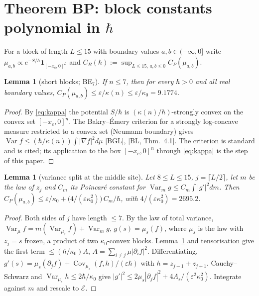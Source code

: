 \documentclass[11pt,a4paper]{article}
\newtheorem{lemma}[theorem]{Lemma}
\theoremstyle{definition}
\theoremstyle{remark}
\newcommand{\Var}{\operatorname{Var}}
\newcommand{\Cov}{\operatorname{Cov}}
\newcommand{\cE}{\mathcal{E}}
\newcommand{\xc}{x_c}
\begin{document}
\section{Theorem BP: block constants polynomial in \texorpdfstring{$\hbar$}{hbar}}\label{sec:BP}

For a block of length $L\le15$ with boundary values $a,b\in(-\infty,0]$ write $\mu_{a,b}\propto e^{-S/\hbar}\mathbf 1_{[-\xc,0]^L}$ and $C_B(\hbar):=\sup_{L\le15,\,a,b\le0}C_P(\mu_{a,b})$.

\begin{lemma}[short blocks; BE$_7$]\label{lem:BE7}
If $n\le7$, then for every $\hbar>0$ and all real boundary values, $C_P(\mu_{a,b})\le\varepsilon/\kappa(n)\le\varepsilon/\kappa_0=9.1774$.
\end{lemma}
\begin{proof}
By \eqref{eq:kappa} the potential $S/\hbar$ is $(\kappa(n)/\hbar)$-strongly convex on the convex set $[-\xc,0]^n$. The Bakry--\'Emery criterion for a strongly log-concave measure restricted to a convex set (Neumann boundary) gives $\Var f\le(\hbar/\kappa(n))\int|\nabla f|^2d\mu$ [BGL], [BL, Thm.~4.1]. The criterion is standard and is cited; its application to the box $[-\xc,0]^n$ through \eqref{eq:kappa} is the step of this paper.
\end{proof}

\begin{lemma}[variance split at the middle site]\label{lem:split}
Let $8\le L\le15$, $j=\lceil L/2\rceil$, let $m$ be the law of $z_j$ and $C_m$ its Poincar\'e constant for $\Var_mg\le C_m\int|g'|^2dm$. Then $C_P(\mu_{a,b})\le\varepsilon/\kappa_0+\big(4/(\varepsilon\kappa_0^2)\big)\,C_m/\hbar$, with $4/(\varepsilon\kappa_0^2)=2695.2$.
\end{lemma}
\begin{proof}
Both sides of $j$ have length $\le7$. By the law of total variance, $\Var_\mu f=m(\Var_{\mu_s}f)+\Var_m g$, $g(s)=\mu_s(f)$, where $\mu_s$ is the law with $z_j=s$ frozen, a product of two $\kappa_0$-convex blocks. Lemma~\ref{lem:BE7} and tensorisation give the first term $\le(\hbar/\kappa_0)A$, $A=\sum_{i\ne j}\mu|\partial_if|^2$. Differentiating, $g'(s)=\mu_s(\partial_jf)+\Cov_{\mu_s}(f,h)/(\varepsilon\hbar)$ with $h=z_{j-1}+z_{j+1}$. Cauchy--Schwarz and $\Var_{\mu_s}h\le2\hbar/\kappa_0$ give $|g'|^2\le2\mu_s|\partial_jf|^2+4A_s/(\varepsilon^2\kappa_0^2)$. Integrate against $m$ and rescale to $\cE$.
\end{proof}
\end{document}
